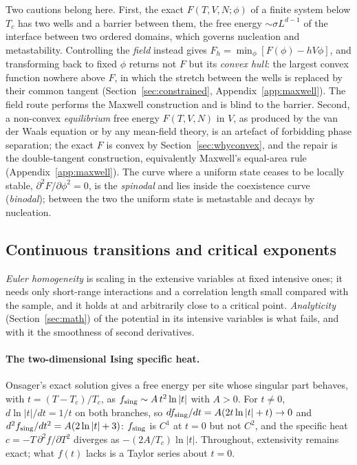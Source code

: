 \documentclass[10pt,a4paper]{article}
\theoremstyle{remark}
\begin{document}
Two cautions belong here. First, the exact $F(T,V,N;\phi)$ of a finite system
below $T_c$ has two wells and a barrier between them, the free energy
$\sim\sigma L^{d-1}$ of the interface between two ordered domains, which
governs nucleation and metastability. Controlling the \emph{field} instead
gives $F_h=\min_\phi[F(\phi)-hV\phi]$, and transforming back to fixed $\phi$
returns not $F$ but its \emph{convex hull}: the largest convex function
nowhere above $F$, in which the stretch between the wells is replaced by their
common tangent (Section~\ref{sec:constrained}, Appendix~\ref{app:maxwell}).
The field route performs the Maxwell construction and is blind to the barrier. Second, a non-convex
\emph{equilibrium} free energy $F(T,V,N)$ in $V$, as produced by the van der
Waals equation or by any mean-field theory, is an artefact of forbidding phase
separation; the exact $F$ is convex by Section~\ref{sec:whyconvex}, and the
repair is the double-tangent construction, equivalently Maxwell's equal-area
rule (Appendix~\ref{app:maxwell}). The curve where a uniform state ceases to
be locally stable, $\partial^{2}F/\partial\phi^{2}=0$, is the \emph{spinodal}
and lies inside the coexistence curve (\emph{binodal}); between the two the
uniform state is metastable and decays by nucleation.

\subsection{Continuous transitions and critical exponents}
\label{sec:critical}

\emph{Euler homogeneity} is scaling in the extensive variables
at fixed intensive ones; it needs only short-range interactions and a
correlation length small compared with the sample, and it holds at and
arbitrarily close to a critical point. \emph{Analyticity}
(Section~\ref{sec:math}) of the potential in its intensive variables is
what fails, and with it the smoothness of second derivatives.

\paragraph{The two-dimensional Ising specific heat.} Onsager's exact solution
gives a free energy per site whose singular part behaves, with
$t=(T-T_c)/T_c$, as $f_{\rm sing}\sim A\,t^{2}\ln|t|$ with $A>0$. For $t\neq0$,
$d\ln|t|/dt=1/t$ on both branches, so $df_{\rm sing}/dt=A(2t\ln|t|+t)\to0$ and
$d^{2}f_{\rm sing}/dt^{2}=A(2\ln|t|+3)$: $f_{\rm sing}$ is $C^{1}$ at $t=0$ but
not $C^{2}$, and the specific heat $c=-T\,\partial^{2}f/\partial T^{2}$
diverges as $-(2A/T_c)\ln|t|$. Throughout, extensivity remains exact; what
$f(t)$ lacks is a Taylor series about $t=0$.
\end{document}
